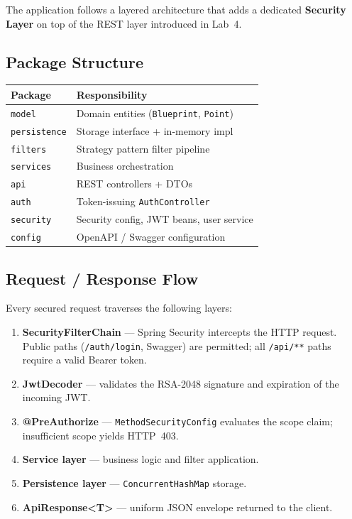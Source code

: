 \documentclass[10pt,a4paper,twocolumn]{article}
\begin{document}
The application follows a layered architecture that adds a dedicated
\textbf{Security Layer} on top of the REST layer introduced in Lab~4.

\subsection{Package Structure}

\begin{center}
\small
\begin{tabular}{@{}ll@{}}
\toprule
\textbf{Package} & \textbf{Responsibility} \\
\midrule
\texttt{model}       & Domain entities (\texttt{Blueprint}, \texttt{Point}) \\
\texttt{persistence} & Storage interface + in-memory impl \\
\texttt{filters}     & Strategy pattern filter pipeline \\
\texttt{services}    & Business orchestration \\
\texttt{api}         & REST controllers + DTOs \\
\texttt{auth}        & Token-issuing \texttt{AuthController} \\
\texttt{security}    & Security config, JWT beans, user service \\
\texttt{config}      & OpenAPI / Swagger configuration \\
\bottomrule
\end{tabular}
\end{center}

\subsection{Request / Response Flow}

Every secured request traverses the following layers:

\begin{enumerate}
  \item \textbf{SecurityFilterChain} — Spring Security intercepts the HTTP
        request. Public paths (\texttt{/auth/login}, Swagger) are permitted;
        all \texttt{/api/**} paths require a valid Bearer token.
  \item \textbf{JwtDecoder} — validates the RSA-2048 signature and
        expiration of the incoming JWT.
  \item \textbf{@PreAuthorize} — \texttt{MethodSecurityConfig} evaluates the
        scope claim; insufficient scope yields HTTP~403.
  \item \textbf{Service layer} — business logic and filter application.
  \item \textbf{Persistence layer} — \texttt{ConcurrentHashMap} storage.
  \item \textbf{ApiResponse\textless{}T\textgreater{}} — uniform JSON
        envelope returned to the client.
\end{enumerate}
\end{document}
